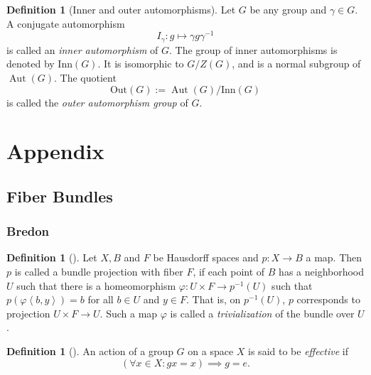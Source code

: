 \documentclass[reqno]{amsart}
\theoremstyle{definition}
\newtheorem{definition}[theorem]{Definition}
\theoremstyle{remark}
\DeclareMathOperator{\Aut}{Aut}
\begin{document}
\begin{definition}[Inner and outer automorphisms]
    Let $G$ be any group and $\gamma \in G$. A conjugate
    automorphism 
    \[
    I_{\gamma} \colon g \mapsto \gamma g \gamma^{-1}
    \] 
    is called an \textit{inner automorphism} of $G$.
    The group of inner automorphisms is denoted
    by $\text{Inn}(G)$. It is isomorphic to
    $G / Z(G)$, and is a normal subgroup of
    $\Aut(G)$. The quotient
    \[
    \text{Out}(G) := \Aut(G) / \text{Inn}(G)
    \] 
    is called the \textit{outer automorphism group} of
    $G$.
\end{definition}




\section{Appendix}

\subsection{Fiber Bundles}

\subsubsection{Bredon}

\begin{definition}[]
    Let $X, B$ and $F$ be Hausdorff spaces and
    $p \colon X \to B$ a map.
    Then $p$ is called a bundle projection with
    fiber $F$, if each point of
    $B$ has a neighborhood $U$ such that there
    is a homeomorphism $\varphi \colon U \times F \to 
    p^{-1}(U) $ such that $p \left( \varphi
    \left<b,y  \right>\right) = b$ for all $b \in U$ and
    $y \in F$. That is, on  $p^{-1}(U)$, $p$ corresponds
    to projection $U \times F \to U$. Such a map
    $\varphi $ is called a \textit{trivialization} of the
    bundle over $U$.
\end{definition}

\begin{definition}[]
    An action of a group $G$ on a space $X$ is
    said to be \textit{effective} if
    \[
        \left( \forall x \in X \colon
        gx = x \right) \implies g = e.
    \] 
\end{definition}
\end{document}

